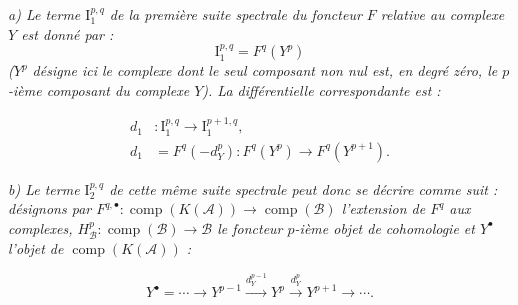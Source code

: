 \noindent\textit{a) Le terme $\mathrm I_1^{p,q}$ de la première suite
spectrale du foncteur $F$ relative au complexe $Y$ est donné par :}
\[
\mathrm I_1^{p,q}=F^q(Y^p)
\]
\noindent\textit{($Y^p$ désigne ici le complexe dont le seul composant non
nul est, en degré zéro, le $p$-ième composant du complexe $Y$). La
différentielle correspondante est :}

\[
\begin{aligned}
d_1&\colon\mathrm I_1^{p,q}\longrightarrow\mathrm I_1^{p+1,q},\\
d_1&=F^q(-d_Y^p)\colon F^q(Y^p)\longrightarrow F^q(Y^{p+1}).
\end{aligned}
\]

\noindent\textit{b) Le terme $\mathrm I_2^{p,q}$ de cette même suite
spectrale peut donc se décrire comme suit : désignons par
$F^{q,\bullet}\colon\operatorname{comp}(K(\mathcal A))
\longrightarrow\operatorname{comp}(\mathcal B)$ l'extension de $F^q$ aux
complexes, $H_{\mathcal B}^p\colon\operatorname{comp}(\mathcal B)
\longrightarrow\mathcal B$ le foncteur $p$-ième objet de cohomologie et
$Y^\bullet$ l'objet de $\operatorname{comp}(K(\mathcal A))$ :}

\[
Y^\bullet=\cdots\longrightarrow Y^{p-1}
\xrightarrow{d_Y^{p-1}}Y^p\xrightarrow{d_Y^p}Y^{p+1}
\longrightarrow\cdots.
\]
\endgroup
